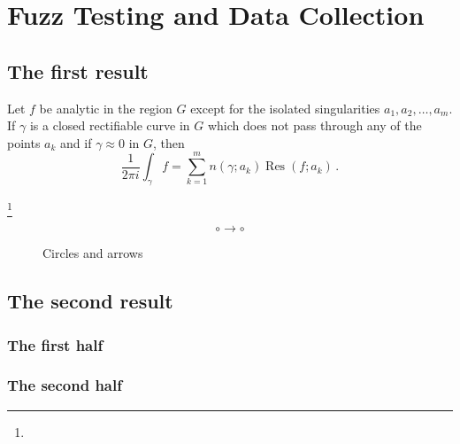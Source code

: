 
\chapter{Fuzz Testing and Data Collection}

\section{The first result}

\begin{thm}
Let $f$ be analytic in the region $G$ except for the isolated 
singularities $a_1,a_2,\dots,a_m$. If $\gamma$ is a closed 
rectifiable curve in $G$ which does not pass through any of the 
points $a_k$ and if $\gamma\approx 0$ in $G$, then
\[
  \frac{1}{2\pi i}\int_\gamma\! f = \sum_{k=1}^m 
  n(\gamma;a_k)\mathop{\mathrm{Res}}(f;a_k)\,.
\]
\end{thm}

\blindtext\footnote{\blindtext}

\begin{figure}
  \[ \circ \to \circ \]
  \caption{Circles and arrows}
\end{figure}

\section{The second result}

\subsection{The first half}
  
\blindtext\pagenote{\blindtext}

\subsection{The second half}

\blindtext
